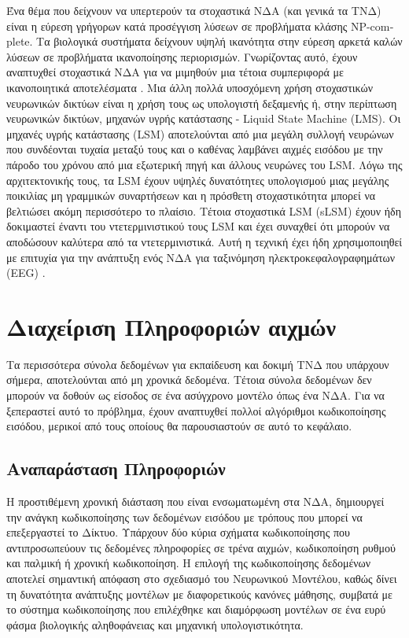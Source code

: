 \documentclass[12pt]{report}
\begin{document}
Ένα θέμα που δείχνουν να υπερτερούν τα στοχαστικά ΝΔΑ (και γενικά τα ΤΝΔ) είναι η εύρεση γρήγορων κατά προσέγγιση λύσεων σε προβλήματα κλάσης \textlatin{NP-complete}. Τα βιολογικά συστήματα δείχνουν υψηλή ικανότητα στην εύρεση αρκετά καλών λύσεων σε προβλήματα ικανοποίησης περιορισμών. Γνωρίζοντας αυτό, έχουν αναπτυχθεί στοχαστικά ΝΔΑ για να μιμηθούν μια τέτοια συμπεριφορά με ικανοποιητικά αποτελέσματα \cite{Fonseca2017}. Μια άλλη πολλά υποσχόμενη χρήση στοχαστικών νευρωνικών δικτύων είναι η χρήση τους ως υπολογιστή δεξαμενής ή, στην περίπτωση νευρωνικών δικτύων, μηχανών υγρής κατάστασης - \textlatin{Liquid State Machine (LMS)}. Οι μηχανές υγρής κατάστασης (\textlatin{LSM}) αποτελούνται από μια μεγάλη συλλογή νευρώνων που συνδέονται τυχαία μεταξύ τους και ο καθένας λαμβάνει αιχμές εισόδου με την πάροδο του χρόνου από μια εξωτερική πηγή και άλλους νευρώνες του \textlatin{LSM}. Λόγω της αρχιτεκτονικής τους, τα \textlatin{LSM} έχουν υψηλές δυνατότητες υπολογισμού μιας μεγάλης ποικιλίας μη γραμμικών συναρτήσεων και η πρόσθετη στοχαστικότητα μπορεί να βελτιώσει ακόμη περισσότερο το πλαίσιο. Τέτοια στοχαστικά \textlatin{LSM (sLSM)} έχουν ήδη δοκιμαστεί έναντι του ντετερμινιστικού τους \textlatin{LSM} \cite{IEEE2011} και έχει συναχθεί ότι μπορούν να αποδώσουν καλύτερα από τα ντετερμινιστικά. Αυτή η τεχνική έχει ήδη χρησιμοποιηθεί με επιτυχία για την ανάπτυξη ενός ΝΔΑ για ταξινόμηση ηλεκτροκεφαλογραφημάτων (\textlatin{EEG}) \cite{Nuntalid2011}.

\bigskip
\chapter{Διαχείριση Πληροφοριών αιχμών}

Τα περισσότερα σύνολα δεδομένων για εκπαίδευση και δοκιμή ΤΝΔ που υπάρχουν σήμερα, αποτελούνται από μη χρονικά δεδομένα. Τέτοια σύνολα δεδομένων δεν μπορούν να δοθούν ως είσοδος σε ένα ασύγχρονο μοντέλο όπως ένα ΝΔΑ. Για να ξεπεραστεί αυτό το πρόβλημα, έχουν αναπτυχθεί πολλοί αλγόριθμοι κωδικοποίησης εισόδου, μερικοί από τους οποίους θα παρουσιαστούν σε αυτό το κεφάλαιο.

\section{Αναπαράσταση Πληροφοριών}

Η προστιθέμενη χρονική διάσταση που είναι ενσωματωμένη στα ΝΔΑ, δημιουργεί την ανάγκη κωδικοποίησης των δεδομένων εισόδου με τρόπους που μπορεί να επεξεργαστεί το Δίκτυο. Υπάρχουν δύο κύρια σχήματα κωδικοποίησης που αντιπροσωπεύουν τις δεδομένες πληροφορίες σε τρένα αιχμών, κωδικοποίηση ρυθμού και παλμική ή χρονική κωδικοποίηση. Η επιλογή της κωδικοποίησης δεδομένων αποτελεί σημαντική απόφαση στο σχεδιασμό του Νευρωνικού Μοντέλου, καθώς δίνει τη δυνατότητα ανάπτυξης μοντέλων με διαφορετικούς κανόνες μάθησης, συμβατά με το σύστημα κωδικοποίησης που επιλέχθηκε και διαμόρφωση μοντέλων σε ένα ευρύ φάσμα βιολογικής αληθοφάνειας και μηχανική υπολογιστικότητα.
\end{document}
